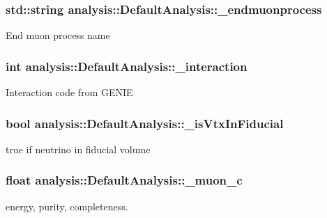 \subsubsection[{\texorpdfstring{\+\_\+endmuonprocess}{_endmuonprocess}}]{\setlength{\rightskip}{0pt plus 5cm}std\+::string analysis\+::\+Default\+Analysis\+::\+\_\+endmuonprocess\hspace{0.3cm}{\ttfamily [private]}}\hypertarget{classanalysis_1_1DefaultAnalysis_a8cbb24a231e167258d2914f92bc4af22}{}\label{classanalysis_1_1DefaultAnalysis_a8cbb24a231e167258d2914f92bc4af22}
End muon process name 
\subsubsection[{\texorpdfstring{\+\_\+interaction}{_interaction}}]{\setlength{\rightskip}{0pt plus 5cm}int analysis\+::\+Default\+Analysis\+::\+\_\+interaction\hspace{0.3cm}{\ttfamily [private]}}\hypertarget{classanalysis_1_1DefaultAnalysis_a35c01b4be6d678e89cada927ab2ba45c}{}\label{classanalysis_1_1DefaultAnalysis_a35c01b4be6d678e89cada927ab2ba45c}
Interaction code from G\+E\+N\+IE 
\subsubsection[{\texorpdfstring{\+\_\+is\+Vtx\+In\+Fiducial}{_isVtxInFiducial}}]{\setlength{\rightskip}{0pt plus 5cm}bool analysis\+::\+Default\+Analysis\+::\+\_\+is\+Vtx\+In\+Fiducial\hspace{0.3cm}{\ttfamily [private]}}\hypertarget{classanalysis_1_1DefaultAnalysis_a3235e005677abb89da08d1668257bca3}{}\label{classanalysis_1_1DefaultAnalysis_a3235e005677abb89da08d1668257bca3}
true if neutrino in fiducial volume 
\subsubsection[{\texorpdfstring{\+\_\+muon\+\_\+c}{_muon_c}}]{\setlength{\rightskip}{0pt plus 5cm}float analysis\+::\+Default\+Analysis\+::\+\_\+muon\+\_\+c\hspace{0.3cm}{\ttfamily [private]}}\hypertarget{classanalysis_1_1DefaultAnalysis_ac6226239ce3915d1363f8038583e8960}{}\label{classanalysis_1_1DefaultAnalysis_ac6226239ce3915d1363f8038583e8960}
energy, purity, completeness. 
